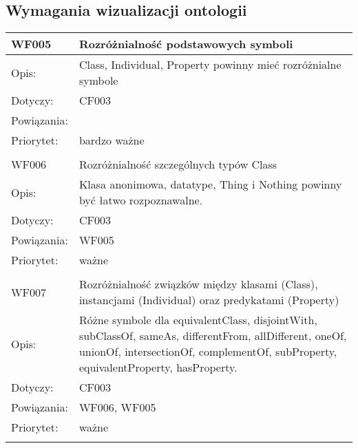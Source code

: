 \subsection{Wymagania wizualizacji ontologii}

\begin{center}
\begin{longtable}{|m{3cm}|m{9cm}|} \hline

WF005 & Rozróżnialność podstawowych symboli  \\ \hline
Opis: &  Class, Individual, Property powinny mieć rozróżnialne symbole   \\ \hline
Dotyczy: &  CF003 \\ \hline
Powiązania: & \\ \hline
Priorytet: & bardzo ważne \\ \hline

\multicolumn{2}{c}{} \\
 \hline

WF006 &   Rozróżnialność szczególnych typów Class\\ \hline
Opis: &   Klasa anonimowa, datatype, Thing i Nothing powinny być łatwo rozpoznawalne.  \\ \hline
Dotyczy: &  CF003 \\ \hline
Powiązania: & WF005 \\ \hline
Priorytet: &  ważne \\ \hline

\multicolumn{2}{c}{} \\
 \hline

WF007 &  Rozróżnialność związków między klasami (Class), instancjami (Individual) oraz predykatami (Property)\\ \hline
Opis: & Różne symbole dla equivalentClass, disjointWith, subClassOf, sameAs, differentFrom, allDifferent, oneOf, unionOf, intersectionOf,
 complementOf, subProperty, equivalentProperty, hasProperty.   \\ \hline
Dotyczy: &  CF003\\ \hline
Powiązania: & WF006, WF005 \\ \hline
Priorytet: & ważne \\ \hline

\multicolumn{2}{c}{} \\
 \hline


\end{longtable}
\end{center}
